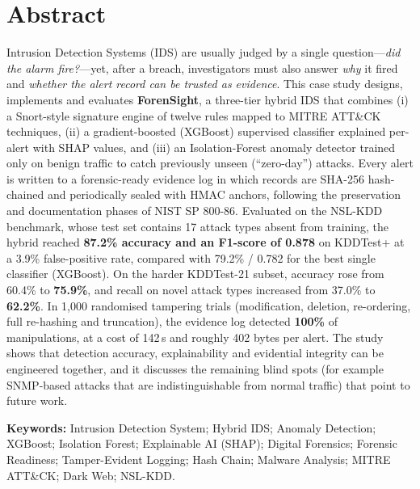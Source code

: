 \documentclass[12pt,a4paper,oneside]{article}
\newcommand{\hl}[1]{\textbf{\color{rblue}#1}}
\begin{document}
\section*{\color{rblue}Abstract}
Intrusion Detection Systems (IDS) are usually judged by a single question---\emph{did the alarm fire?}---yet, after a breach, investigators must also answer \emph{why} it fired and \emph{whether the alert record can be trusted as evidence}. This case study designs, implements and evaluates \hl{ForenSight}, a three-tier hybrid IDS that combines (i) a Snort-style signature engine of twelve rules mapped to MITRE ATT\&CK techniques, (ii) a gradient-boosted (XGBoost) supervised classifier explained per-alert with SHAP values, and (iii) an Isolation-Forest anomaly detector trained only on benign traffic to catch previously unseen (``zero-day'') attacks. Every alert is written to a forensic-ready evidence log in which records are SHA-256 hash-chained and periodically sealed with HMAC anchors, following the preservation and documentation phases of NIST SP 800-86. Evaluated on the NSL-KDD benchmark, whose test set contains 17 attack types absent from training, the hybrid reached \hl{87.2\% accuracy and an F1-score of 0.878} on KDDTest+ at a 3.9\% false-positive rate, compared with 79.2\% / 0.782 for the best single classifier (XGBoost). On the harder KDDTest-21 subset, accuracy rose from 60.4\% to \hl{75.9\%}, and recall on novel attack types increased from 37.0\% to \hl{62.2\%}. In 1{,}000 randomised tampering trials (modification, deletion, re-ordering, full re-hashing and truncation), the evidence log detected \hl{100\%} of manipulations, at a cost of 142\,\textmu s and roughly 402 bytes per alert. The study shows that detection accuracy, explainability and evidential integrity can be engineered together, and it discusses the remaining blind spots (for example SNMP-based attacks that are indistinguishable from normal traffic) that point to future work.

\vspace{6pt}
\noindent\textbf{\textcolor{rblue}{Keywords:}} Intrusion Detection System; Hybrid IDS; Anomaly Detection; XGBoost; Isolation Forest; Explainable AI (SHAP); Digital Forensics; Forensic Readiness; Tamper-Evident Logging; Hash Chain; Malware Analysis; MITRE ATT\&CK; Dark Web; NSL-KDD.

\vspace{8pt}
{\hypersetup{linkcolor=black}\small\tableofcontents}
\newpage
\end{document}
